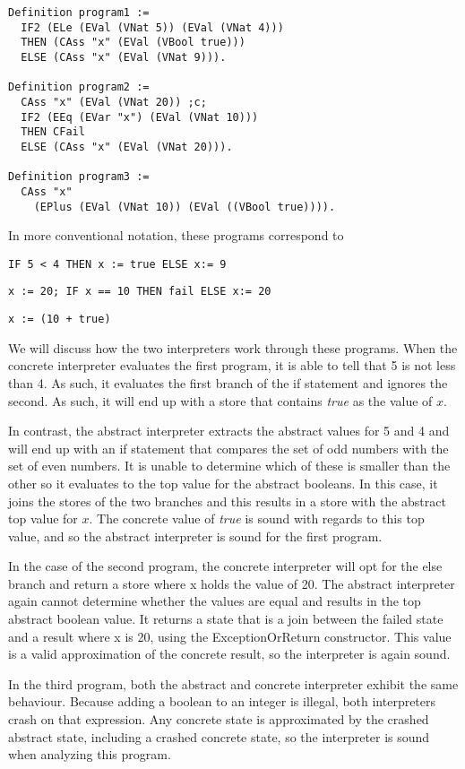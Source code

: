 \begin{verbatim}
Definition program1 := 
  IF2 (ELe (EVal (VNat 5)) (EVal (VNat 4))) 
  THEN (CAss "x" (EVal (VBool true))) 
  ELSE (CAss "x" (EVal (VNat 9))).

Definition program2 :=
  CAss "x" (EVal (VNat 20)) ;c;
  IF2 (EEq (EVar "x") (EVal (VNat 10)))
  THEN CFail
  ELSE (CAss "x" (EVal (VNat 20))).

Definition program3 :=
  CAss "x" 
  	(EPlus (EVal (VNat 10)) (EVal ((VBool true)))).
\end{verbatim}

In more conventional notation, these programs correspond to

\begin{lstlisting}
IF 5 < 4 THEN x := true ELSE x:= 9
\end{lstlisting}

\begin{lstlisting}
x := 20; IF x == 10 THEN fail ELSE x:= 20
\end{lstlisting}

\begin{lstlisting}
x := (10 + true)
\end{lstlisting}

We will discuss how the two interpreters work through these programs. When the
concrete interpreter evaluates the first program, it is able to tell that 5 is
not less than 4. As such, it evaluates the first branch of the if statement and
ignores the second. As such, it will end up with a store that contains
\textit{true} as the value of $x$.

In contrast, the abstract interpreter extracts the abstract values for 5 and 4
and will end up with an if statement that compares the set of odd numbers with
the set of even numbers. It is unable to determine which of these is smaller
than the other so it evaluates to the top value for the abstract booleans. In
this case, it joins the stores of the two branches and this results in a store
with the abstract top value for $x$. The concrete value of \textit{true} is
sound with regards to this top value, and so the abstract interpreter is sound
for the first program.

In the case of the second program, the concrete interpreter will opt for the
else branch and return a store where x holds the value of 20. The abstract
interpreter again cannot determine whether the values are equal and results in
the top abstract boolean value. It returns a state that is a join between the
failed state and a result where x is 20, using the ExceptionOrReturn
constructor. This value is a valid approximation of the concrete result, so the
interpreter is again sound.

In the third program, both the abstract and concrete interpreter exhibit the
same behaviour. Because adding a boolean to an integer is illegal, both
interpreters crash on that expression. Any concrete state is approximated by
the crashed abstract state, including a crashed concrete state, so the
interpreter is sound when analyzing this program.


